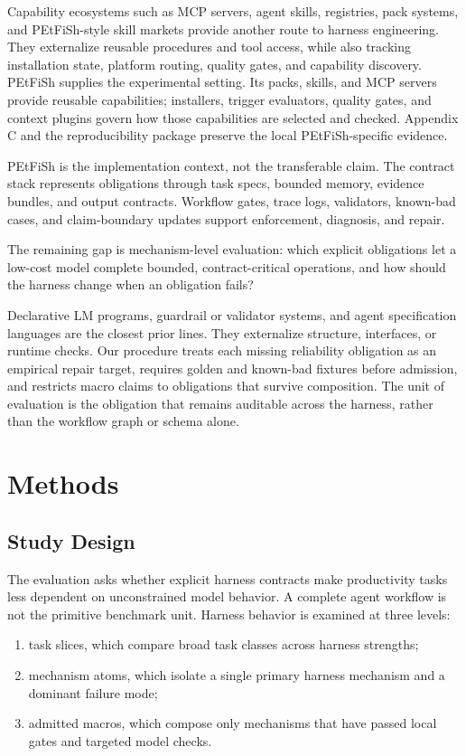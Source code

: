 \documentclass[11pt]{article}
\begin{document}
Capability ecosystems such as MCP servers, agent skills, registries, pack systems, and PEtFiSh-style skill markets provide another route to harness engineering. They externalize reusable procedures and tool access, while also tracking installation state, platform routing, quality gates, and capability discovery. PEtFiSh supplies the experimental setting. Its packs, skills, and MCP servers provide reusable capabilities; installers, trigger evaluators, quality gates, and context plugins govern how those capabilities are selected and checked. Appendix C and the reproducibility package preserve the local PEtFiSh-specific evidence.

PEtFiSh is the implementation context, not the transferable claim. The contract stack represents obligations through task specs, bounded memory, evidence bundles, and output contracts. Workflow gates, trace logs, validators, known-bad cases, and claim-boundary updates support enforcement, diagnosis, and repair.

The remaining gap is mechanism-level evaluation: which explicit obligations let a low-cost model complete bounded, contract-critical operations, and how should the harness change when an obligation fails?

Declarative LM programs, guardrail or validator systems, and agent specification languages are the closest prior lines. They externalize structure, interfaces, or runtime checks. Our procedure treats each missing reliability obligation as an empirical repair target, requires golden and known-bad fixtures before admission, and restricts macro claims to obligations that survive composition. The unit of evaluation is the obligation that remains auditable across the harness, rather than the workflow graph or schema alone.

\section{Methods}

\subsection{Study Design}

The evaluation asks whether explicit harness contracts make productivity tasks less dependent on unconstrained model behavior. A complete agent workflow is not the primitive benchmark unit. Harness behavior is examined at three levels:

\begin{enumerate}
\item task slices, which compare broad task classes across harness strengths;
\item mechanism atoms, which isolate a single primary harness mechanism and a dominant failure mode;
\item admitted macros, which compose only mechanisms that have passed local gates and targeted model checks.
\end{enumerate}
\end{document}
